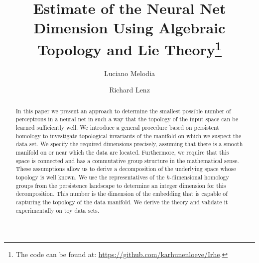 \documentclass[runningheads,orivec]{llncs}
\begin{document}
%
\title{Estimate of the Neural Net Dimension Using Algebraic Topology and Lie Theory\thanks{The code can be found at: \href{https://github.com/karhunenloeve/Irhe}{https://github.com/karhunenloeve/Irhe}.}}
%
%

\author{Luciano Melodia \\
\and Richard Lenz}
%
%
%
\maketitle              %
%
\begin{abstract}
In this paper we present an approach to determine the smallest possible number of perceptrons in a neural net in such a way that the topology of the input space can be learned sufficiently well. We introduce a general procedure based on persistent homology to investigate topological invariants of the manifold on which we suspect the data set. We specify the required dimensions precisely, assuming that there is a smooth manifold on or near which the data are located. Furthermore, we require that this space is connected and has a commutative group structure in the mathematical sense. These assumptions allow us to derive a decomposition of the underlying space whose topology is well known. We use the representatives of the $k$-dimensional homology groups from the persistence landscape to determine an integer dimension for this decomposition. This number is the dimension of the embedding that is capable of capturing the topology of the data manifold. We derive the theory and validate it experimentally on toy data sets. 

\end{abstract}
\end{document}
